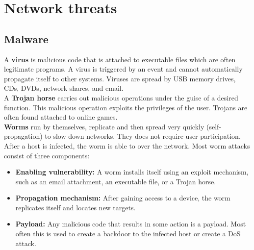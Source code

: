 %

\section{Network threats}

\subsection{Malware}

A \textbf{virus} is malicious code that is attached to executable files which are often legitimate programs. A virus is triggered by an event and cannot automatically propagate itself to other systems. Viruses are spread by USB memory drives, CDs, DVDs, network shares, and email.\\

A \textbf{Trojan horse} carries out malicious operations under the guise of a desired function. This malicious operation exploits the privileges of the user. Trojans are often found attached to online games. \\

\textbf{Worms} run by themselves, replicate and then spread very quickly (self-propagation) to slow down networks. They does not require user participation. After a host is infected, the worm is able to  over the network. Most worm attacks consist of three components:

\begin{itemize}
\item \textbf{Enabling vulnerability:} A worm installs itself using an exploit mechanism, such as an email attachment, an executable file, or a Trojan horse.
\item \textbf{Propagation mechanism:} After gaining access to a device, the worm replicates itself and locates new targets.
\item \textbf{Payload:} Any malicious code that results in some action is a payload. Most often this is used to create a backdoor to the infected host or create a DoS attack.
\end{itemize}

